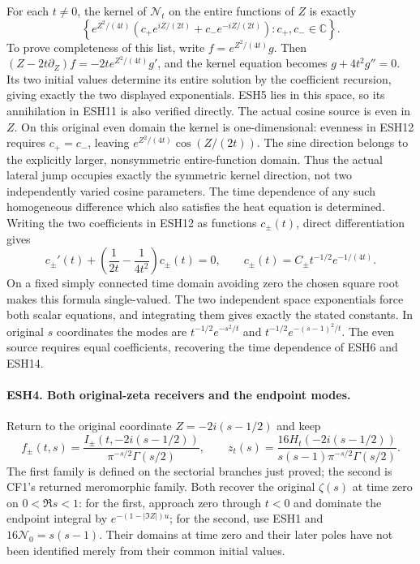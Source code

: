 For each \(t\ne0\), the kernel of \(\mathcal N_t\) on the
entire functions of \(Z\) is exactly
\[
 \left\{
 e^{Z^2/(4t)}
 \left(c_+e^{iZ/(2t)}+c_-e^{-iZ/(2t)}\right):
          c_+,c_-\in\mathbb C\right\}.                   \tag{ESH12}
\]
To prove completeness of this list, write
\(f=e^{Z^2/(4t)}g\). Then
\((Z-2t\partial_Z)f=-2t e^{Z^2/(4t)}g'\), and the
kernel equation becomes \(g+4t^2g''=0\). Its two initial
values determine its entire solution by the coefficient recursion,
giving exactly the two displayed exponentials. ESH5 lies in this
space, so its annihilation in ESH11 is also verified directly.
The actual cosine source is even in \(Z\). On this original
even domain the kernel is one-dimensional: evenness in ESH12
requires \(c_+=c_-\), leaving
\(e^{Z^2/(4t)}\cos(Z/(2t))\). The sine direction belongs
to the explicitly larger, nonsymmetric entire-function domain.
Thus the actual lateral jump occupies exactly the symmetric
kernel direction, not two independently varied cosine parameters.
The time dependence of any such homogeneous difference which
also satisfies the heat equation is determined. Writing the
two coefficients in ESH12 as functions \(c_\pm(t)\), direct
differentiation gives
\[
 c_\pm'(t)+\left(\frac1{2t}-\frac1{4t^2}\right)c_\pm(t)=0,
 \qquad c_\pm(t)=C_\pm t^{-1/2}e^{-1/(4t)}.              \tag{ESH18}
\]
On a fixed simply connected time domain avoiding zero the chosen
square root makes this formula single-valued. The two independent
space exponentials force both scalar equations, and integrating
them gives exactly the stated constants. In original \(s\)
coordinates the modes are \(t^{-1/2}e^{-s^2/t}\) and
\(t^{-1/2}e^{-(s-1)^2/t}\). The even source requires equal
coefficients, recovering the time dependence of ESH6 and ESH14.

\paragraph{ESH4. Both original-zeta receivers and the endpoint modes.}
Return to the original coordinate \(Z=-2i(s-1/2)\) and keep
\[
 f_\pm(t,s)=\frac{I_\pm(t,-2i(s-1/2))}
                   {\pi^{-s/2}\Gamma(s/2)},\qquad
 z_t(s)=\frac{16H_t(-2i(s-1/2))}
                 {s(s-1)\pi^{-s/2}\Gamma(s/2)}.           \tag{ESH13}
\]
The first family is defined on the sectorial branches just proved;
the second is CF1's returned meromorphic family. Both recover the
original \(\zeta(s)\) at time zero on \(0<\Re s<1\):
for the first, approach zero through \(t<0\) and dominate the
endpoint integral by \(e^{-(1-|\Im Z|)u}\); for the second,
use ESH1 and \(16\mathcal N_0=s(s-1)\).
Their domains at time zero and their later poles have not been
identified merely from their common initial values.

